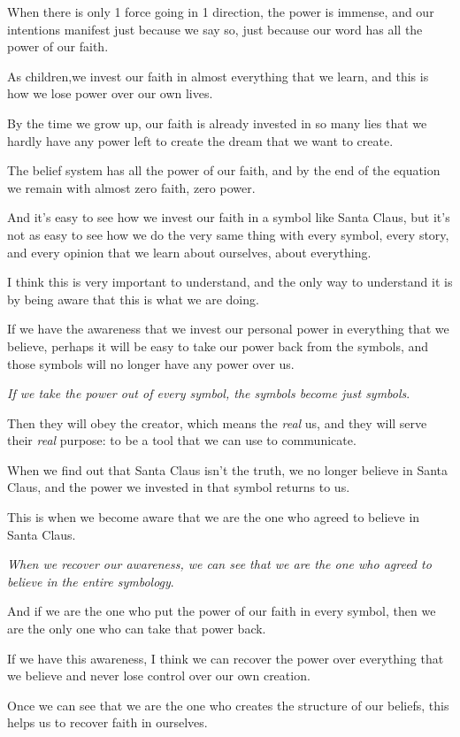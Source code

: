 \documentclass{article}
\numberwithin{equation}{section}
\begin{document}
When there is only 1 force going in 1 direction, the power is immense, and our intentions manifest just because we say so, just because our word has all the power of our faith.

%
As children,we invest our faith in almost everything that we learn, and this is how we lose power over our own lives.

By the time we grow up, our faith is already invested in so many lies that we hardly have any power left to create the dream that we want to create.

The belief system has all the power of our faith, and by the end of the equation we remain with almost zero faith, zero power.

And it's easy to see how we invest our faith in a symbol like Santa Claus, but it's not as easy to see how we do the very same thing with every symbol, every story, and every opinion that we learn about ourselves, about everything.

%
I think this is very important to understand, and the only way to understand it is by being aware that this is what we are doing.

If we have the awareness that we invest our personal power in everything that we believe, perhaps it will be easy to take our power back from the symbols, and those symbols will no longer have any power over us.

\textit{If we take the power out of every symbol, the symbols become just symbols}.

Then they will obey the creator, which means the \textit{real} us, and they will serve their \textit{real} purpose: to be a tool that we can use to communicate.

%
When we find out that Santa Claus isn't the truth, we no longer believe in Santa Claus, and the power we invested in that symbol returns to us.

This is when we become aware that we are the one who agreed to believe in Santa Claus.

\textit{When we recover our awareness, we can see that we are the one who agreed to believe in the entire symbology}.

And if we are the one who put the power of our faith in every symbol, then we are the only one who can take that power back.

If we have this awareness, I think we can recover the power over everything that we believe and never lose control over our own creation.

Once we can see that we are the one who creates the structure of our beliefs, this helps us to recover faith in ourselves.
\end{document}
